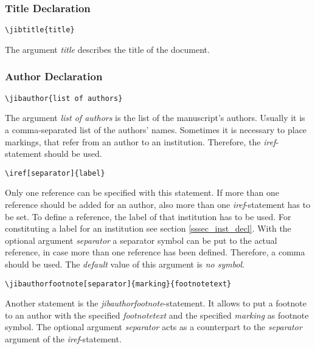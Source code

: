 \documentclass{jib}
\newlength{\platz}
\begin{document}
\subsubsection{Title Declaration}

\begin{lstlisting}[emph={title}]
\jibtitle{title}
\end{lstlisting}

The argument \emph{title} describes the title of the document.

\vspace{\platz}
\subsubsection{Author Declaration}

\begin{lstlisting}[emph={list, of, authors}]
\jibauthor{list of authors}
\end{lstlisting}

The argument \emph{list of authors} is the list of the manuscript's authors.
Usually it is a comma-separated list of the authors' names. Sometimes it is
necessary to place markings, that refer from an author to an institution.
Therefore, the \emph{iref}-statement should be used.

\begin{lstlisting}[emph={separator, label}]
\iref[separator]{label}
\end{lstlisting}

Only one reference can be specified with this statement. If more than one
reference should be added for an author, also more than one
\emph{iref}-statement has to be set. To define a reference, the label of that
institution has to be used. For constituting a label for an institution see
section \ref{sssec_inst_decl}. With the optional argument \emph{separator} a
separator symbol can be put to the actual reference, in case more than one
reference has been defined. Therefore, a comma should be used. The
\emph{default} value of this argument is \emph{no symbol}.

\begin{lstlisting}[emph={separator, marking, footnotetext}]
\jibauthorfootnote[separator]{marking}{footnotetext}
\end{lstlisting}

Another statement is the \emph{jibauthorfootnote}-statement. It allows to put a
footnote to an author with the specified \emph{footnotetext} and the specified
\emph{marking} as footnote symbol. The optional argument \emph{separator} acts
as a counterpart to the \emph{separator} argument of the \emph{iref}-statement.
\end{document}
